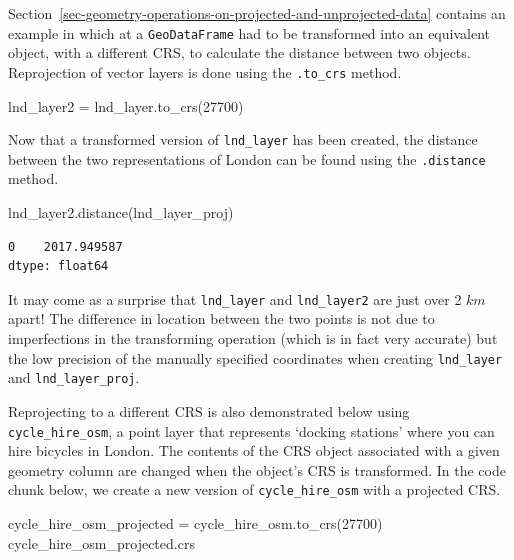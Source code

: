 \documentclass[
  letterpaper,
]{krantz}
\newenvironment{Shaded}{\begin{snugshade}}{\end{snugshade}}
\newcommand{\DecValTok}[1]{\textcolor[rgb]{0.68,0.00,0.00}{#1}}
\newcommand{\NormalTok}[1]{\textcolor[rgb]{0.00,0.23,0.31}{#1}}
\newcommand{\OperatorTok}[1]{\textcolor[rgb]{0.37,0.37,0.37}{#1}}
\begin{document}
Section~\ref{sec-geometry-operations-on-projected-and-unprojected-data}
contains an example in which at a \texttt{GeoDataFrame} had to be
transformed into an equivalent object, with a different CRS, to
calculate the distance between two objects. Reprojection of vector
layers is done using the \texttt{.to\_crs} method.

\begin{Shaded}
\begin{Highlighting}[]
\NormalTok{lnd\_layer2 }\OperatorTok{=}\NormalTok{ lnd\_layer.to\_crs(}\DecValTok{27700}\NormalTok{)}
\end{Highlighting}
\end{Shaded}

Now that a transformed version of \texttt{lnd\_layer} has been created,
the distance between the two representations of London can be found
using the \texttt{.distance} method.

\begin{Shaded}
\begin{Highlighting}[]
\NormalTok{lnd\_layer2.distance(lnd\_layer\_proj)}
\end{Highlighting}
\end{Shaded}

\begin{verbatim}
0    2017.949587
dtype: float64
\end{verbatim}

It may come as a surprise that \texttt{lnd\_layer} and
\texttt{lnd\_layer2} are just over 2 \(km\) apart! The difference in
location between the two points is not due to imperfections in the
transforming operation (which is in fact very accurate) but the low
precision of the manually specified coordinates when creating
\texttt{lnd\_layer} and \texttt{lnd\_layer\_proj}.

Reprojecting to a different CRS is also demonstrated below using
\texttt{cycle\_hire\_osm}, a point layer that represents `docking
stations' where you can hire bicycles in London. The contents of the CRS
object associated with a given geometry column are changed when the
object's CRS is transformed. In the code chunk below, we create a new
version of \texttt{cycle\_hire\_osm} with a projected CRS.

\begin{Shaded}
\begin{Highlighting}[]
\NormalTok{cycle\_hire\_osm\_projected }\OperatorTok{=}\NormalTok{ cycle\_hire\_osm.to\_crs(}\DecValTok{27700}\NormalTok{)}
\NormalTok{cycle\_hire\_osm\_projected.crs}
\end{Highlighting}
\end{Shaded}
\end{document}
